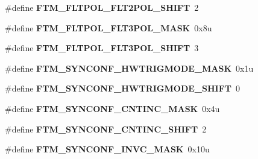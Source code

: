 \begin{DoxyCompactItemize}
\item 
\#define {\bfseries F\+T\+M\+\_\+\+F\+L\+T\+P\+O\+L\+\_\+\+F\+L\+T2\+P\+O\+L\+\_\+\+S\+H\+I\+FT}~2\hypertarget{group__FTM__Register__Masks_gadf4358730058b9bf99f5e8cfde4bd482}{}\label{group__FTM__Register__Masks_gadf4358730058b9bf99f5e8cfde4bd482}

\item 
\#define {\bfseries F\+T\+M\+\_\+\+F\+L\+T\+P\+O\+L\+\_\+\+F\+L\+T3\+P\+O\+L\+\_\+\+M\+A\+SK}~0x8u\hypertarget{group__FTM__Register__Masks_ga56880809c7351258a92bf4f55b1b43d0}{}\label{group__FTM__Register__Masks_ga56880809c7351258a92bf4f55b1b43d0}

\item 
\#define {\bfseries F\+T\+M\+\_\+\+F\+L\+T\+P\+O\+L\+\_\+\+F\+L\+T3\+P\+O\+L\+\_\+\+S\+H\+I\+FT}~3\hypertarget{group__FTM__Register__Masks_gaf5b8746ad3ae33f546df51f36e833b44}{}\label{group__FTM__Register__Masks_gaf5b8746ad3ae33f546df51f36e833b44}

\item 
\#define {\bfseries F\+T\+M\+\_\+\+S\+Y\+N\+C\+O\+N\+F\+\_\+\+H\+W\+T\+R\+I\+G\+M\+O\+D\+E\+\_\+\+M\+A\+SK}~0x1u\hypertarget{group__FTM__Register__Masks_ga60729d222bbb0fe4e36011bd682f4f82}{}\label{group__FTM__Register__Masks_ga60729d222bbb0fe4e36011bd682f4f82}

\item 
\#define {\bfseries F\+T\+M\+\_\+\+S\+Y\+N\+C\+O\+N\+F\+\_\+\+H\+W\+T\+R\+I\+G\+M\+O\+D\+E\+\_\+\+S\+H\+I\+FT}~0\hypertarget{group__FTM__Register__Masks_gaf56e2a17c8f817aa682fb4ad72873d74}{}\label{group__FTM__Register__Masks_gaf56e2a17c8f817aa682fb4ad72873d74}

\item 
\#define {\bfseries F\+T\+M\+\_\+\+S\+Y\+N\+C\+O\+N\+F\+\_\+\+C\+N\+T\+I\+N\+C\+\_\+\+M\+A\+SK}~0x4u\hypertarget{group__FTM__Register__Masks_gafeaceffaaecca1ef7e96a19e21e974fb}{}\label{group__FTM__Register__Masks_gafeaceffaaecca1ef7e96a19e21e974fb}

\item 
\#define {\bfseries F\+T\+M\+\_\+\+S\+Y\+N\+C\+O\+N\+F\+\_\+\+C\+N\+T\+I\+N\+C\+\_\+\+S\+H\+I\+FT}~2\hypertarget{group__FTM__Register__Masks_ga44117438734ea92c0ec67dc7be294074}{}\label{group__FTM__Register__Masks_ga44117438734ea92c0ec67dc7be294074}

\item 
\#define {\bfseries F\+T\+M\+\_\+\+S\+Y\+N\+C\+O\+N\+F\+\_\+\+I\+N\+V\+C\+\_\+\+M\+A\+SK}~0x10u\hypertarget{group__FTM__Register__Masks_ga64738e805ee6dc280986acc586530f28}{}\label{group__FTM__Register__Masks_ga64738e805ee6dc280986acc586530f28}


\end{DoxyCompactItemize}
